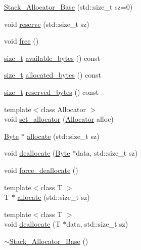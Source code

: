 \begin{DoxyCompactItemize}
\item 
\hyperlink{classbc_1_1allocators_1_1detail_1_1Stack__Allocator__Base_a9f4146c2a38488a0eb4a0f1130b48ad1}{Stack\+\_\+\+Allocator\+\_\+\+Base} (std\+::size\+\_\+t sz=0)
\item 
void \hyperlink{classbc_1_1allocators_1_1detail_1_1Stack__Allocator__Base_aced4b40da5b731bdeaf38fcd73560c25}{reserve} (std\+::size\+\_\+t sz)
\item 
void \hyperlink{classbc_1_1allocators_1_1detail_1_1Stack__Allocator__Base_a9163e65d72c5e36b150d3a5577024dda}{free} ()
\item 
\hyperlink{namespacebc_aaf8e3fbf99b04b1b57c4f80c6f55d3c5}{size\+\_\+t} \hyperlink{classbc_1_1allocators_1_1detail_1_1Stack__Allocator__Base_a364702acb7caa40de0a6db6d6be12424}{available\+\_\+bytes} () const
\item 
\hyperlink{namespacebc_aaf8e3fbf99b04b1b57c4f80c6f55d3c5}{size\+\_\+t} \hyperlink{classbc_1_1allocators_1_1detail_1_1Stack__Allocator__Base_af04771f8573c5f9d4ee109d9d49bb111}{allocated\+\_\+bytes} () const
\item 
\hyperlink{namespacebc_aaf8e3fbf99b04b1b57c4f80c6f55d3c5}{size\+\_\+t} \hyperlink{classbc_1_1allocators_1_1detail_1_1Stack__Allocator__Base_a3a3ad3d03e52366dd62390030a805ee0}{reserved\+\_\+bytes} () const
\item 
{\footnotesize template$<$class Allocator $>$ }\\void \hyperlink{classbc_1_1allocators_1_1detail_1_1Stack__Allocator__Base_ace8c1d19b6675c7b02e4358c5d3a5964}{set\+\_\+allocator} (\hyperlink{classbc_1_1allocators_1_1Allocator}{Allocator} alloc)
\item 
\hyperlink{classbc_1_1allocators_1_1Byte}{Byte} $\ast$ \hyperlink{classbc_1_1allocators_1_1detail_1_1Stack__Allocator__Base_a1d814bdc15336ebee7eca671a14fcbca}{allocate} (std\+::size\+\_\+t sz)
\item 
void \hyperlink{classbc_1_1allocators_1_1detail_1_1Stack__Allocator__Base_a44e96917e9fbebc728b65bd1395bda01}{deallocate} (\hyperlink{classbc_1_1allocators_1_1Byte}{Byte} $\ast$data, std\+::size\+\_\+t sz)
\item 
void \hyperlink{classbc_1_1allocators_1_1detail_1_1Stack__Allocator__Base_aabb6b359c2099a9d4173ee0b0312f16e}{force\+\_\+deallocate} ()
\item 
{\footnotesize template$<$class T $>$ }\\T $\ast$ \hyperlink{classbc_1_1allocators_1_1detail_1_1Stack__Allocator__Base_a76720c8bc1956f70c73e5455287e8543}{allocate} (std\+::size\+\_\+t sz)
\item 
{\footnotesize template$<$class T $>$ }\\void \hyperlink{classbc_1_1allocators_1_1detail_1_1Stack__Allocator__Base_a403f7f90c00193c56813beb564d140f4}{deallocate} (T $\ast$data, std\+::size\+\_\+t sz)
\item 
\hyperlink{classbc_1_1allocators_1_1detail_1_1Stack__Allocator__Base_aa84ebfaaba078da0cc109ef10497fc0c}{$\sim$\+Stack\+\_\+\+Allocator\+\_\+\+Base} ()
\end{DoxyCompactItemize}


